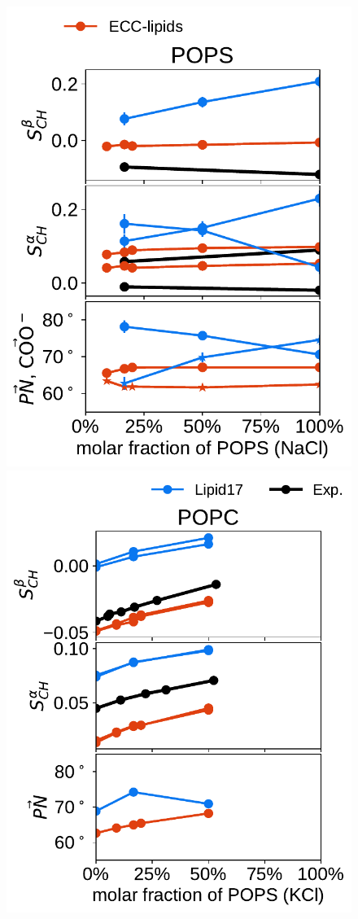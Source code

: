 \documentclass[journal=jpcbfk,manuscript=article]{achemso}
\newlength{\figheightsmall}
\newlength{\figheight}
\begin{document}
\begin{figure}[!tbp]
  \includegraphics[height=\figheightsmall]{../Fig/order_parameters_changes_A-B_PC-PS_mix_POPS_nacl.pdf} 
  \includegraphics[height=\figheightsmall]{../Fig/order_parameters_changes_A-B_PC-PS_mix_POPC_kcl.pdf} 

\end{figure}
\end{document}
